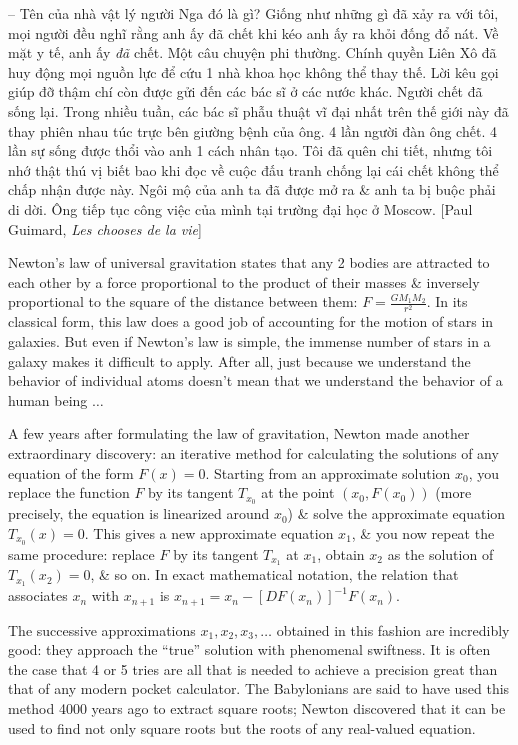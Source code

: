 \documentclass{article}
\begin{document}
\begin{enumerate}
	-- Tên của nhà vật lý người Nga đó là gì? Giống như những gì đã xảy ra với tôi, mọi người đều nghĩ rằng anh ấy đã chết khi kéo anh ấy ra khỏi đống đổ nát. Về mặt y tế, anh ấy {\it đã} chết. Một câu chuyện phi thường. Chính quyền Liên Xô đã huy động mọi nguồn lực để cứu 1 nhà khoa học không thể thay thế. Lời kêu gọi giúp đỡ thậm chí còn được gửi đến các bác sĩ ở các nước khác. Người chết đã sống lại. Trong nhiều tuần, các bác sĩ phẫu thuật vĩ đại nhất trên thế giới này đã thay phiên nhau túc trực bên giường bệnh của ông. 4 lần người đàn ông chết. 4 lần sự sống được thổi vào anh 1 cách nhân tạo. Tôi đã quên chi tiết, nhưng tôi nhớ thật thú vị biết bao khi đọc về cuộc đấu tranh chống lại cái chết không thể chấp nhận được này. Ngôi mộ của anh ta đã được mở ra \& anh ta bị buộc phải di dời. Ông tiếp tục công việc của mình tại trường đại học ở Moscow. [{\sc Paul Guimard}, {\it Les chooses de la vie}]

	{\sc Newton}'s law of universal gravitation states that any 2 bodies are attracted to each other by a force proportional to the product of their masses \& inversely proportional to the square of the distance between them: $F = \frac{GM_1M_2}{r^2}$. In its classical form, this law does a good job of accounting for the motion of stars in galaxies. But even if {\sc Newton}'s law is simple, the immense number of stars in a galaxy makes it difficult to apply. After all, just because we understand the behavior of individual atoms doesn't mean that we understand the behavior of a human being $\ldots$

	A few years after formulating the law of gravitation, {\sc Newton} made another extraordinary discovery: an iterative method for calculating the solutions of any equation of the form $F(x) = 0$. Starting from an approximate solution $x_0$, you replace the function $F$ by its tangent $T_{x_0}$ at the point $(x_0,F(x_0))$ (more precisely, the equation is linearized around $x_0$) \& solve the approximate equation $T_{x_0}(x) = 0$. This gives a new approximate equation $x_1$, \& you now repeat the same procedure: replace $F$ by its tangent $T_{x_1}$ at $x_1$, obtain $x_2$ as the solution of $T_{x_1}(x_2) = 0$, \& so on. In exact mathematical notation, the relation that associates $x_n$ with $x_{n+1}$ is $x_{n+1} = x_n - [DF(x_n)]^{-1}F(x_n)$.

	The successive approximations $x_1,x_2,x_3,\ldots$ obtained in this fashion are incredibly good: they approach the ``true'' solution with phenomenal swiftness. It is often the case that 4 or 5 tries are all that is needed to achieve a precision great than that of any modern pocket calculator. The Babylonians are said to have used this method 4000 years ago to extract square roots; {\sc Newton} discovered that it can be used to find not only square roots but the roots of any real-valued equation.


\end{enumerate}
\end{document}
